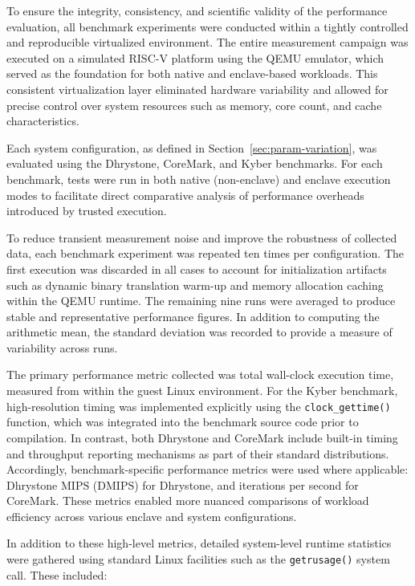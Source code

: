 To ensure the integrity, consistency, and scientific validity of the performance evaluation, all benchmark experiments were conducted within a tightly controlled and reproducible virtualized environment. The entire measurement campaign was executed on a simulated RISC-V platform using the QEMU emulator, which served as the foundation for both native and enclave-based workloads. This consistent virtualization layer eliminated hardware variability and allowed for precise control over system resources such as memory, core count, and cache characteristics.

Each system configuration, as defined in Section~\ref{sec:param-variation}, was evaluated using the Dhrystone, CoreMark, and Kyber benchmarks. For each benchmark, tests were run in both native (non-enclave) and enclave execution modes to facilitate direct comparative analysis of performance overheads introduced by trusted execution.

To reduce transient measurement noise and improve the robustness of collected data, each benchmark experiment was repeated ten times per configuration. The first execution was discarded in all cases to account for initialization artifacts such as dynamic binary translation warm-up and memory allocation caching within the QEMU runtime. The remaining nine runs were averaged to produce stable and representative performance figures. In addition to computing the arithmetic mean, the standard deviation was recorded to provide a measure of variability across runs.

The primary performance metric collected was total wall-clock execution time, measured from within the guest Linux environment. For the Kyber benchmark, high-resolution timing was implemented explicitly using the \texttt{clock\_gettime()} function, which was integrated into the benchmark source code prior to compilation. In contrast, both Dhrystone and CoreMark include built-in timing and throughput reporting mechanisms as part of their standard distributions. Accordingly, benchmark-specific performance metrics were used where applicable: Dhrystone MIPS (DMIPS) for Dhrystone, and iterations per second for CoreMark. These metrics enabled more nuanced comparisons of workload efficiency across various enclave and system configurations.

In addition to these high-level metrics, detailed system-level runtime statistics were gathered using standard Linux facilities such as the \texttt{getrusage()} system call. These included:



